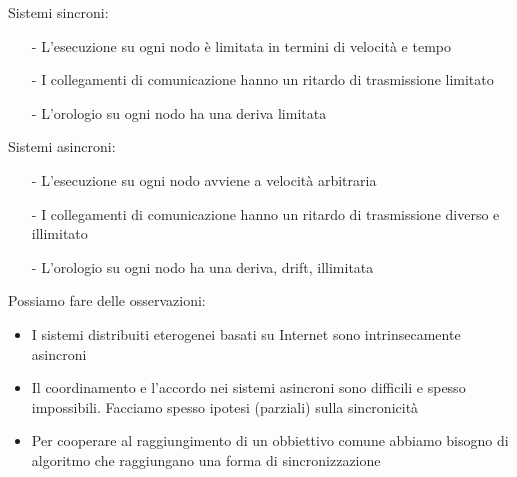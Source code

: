 \documentclass[12pt,italian]{report}
\begin{document}
Sistemi sincroni:
\begin{itemize}
    \item[-] L'esecuzione su ogni nodo è limitata in termini di velocità e tempo
    \item[-] I collegamenti di comunicazione hanno un ritardo di trasmissione limitato
    \item[-] L'orologio su ogni nodo ha una deriva limitata
\end{itemize}
\noindent Sistemi asincroni:
\begin{itemize}
    \item[-] L'esecuzione su ogni nodo avviene a velocità arbitraria
    \item[-] I collegamenti di comunicazione hanno un ritardo di trasmissione diverso e illimitato
    \item[-] L'orologio su ogni nodo ha una deriva, drift, illimitata
\end{itemize}
\newpage
\noindent Possiamo fare delle osservazioni:
\begin{itemize}
    \item I sistemi distribuiti eterogenei basati su Internet sono intrinsecamente asincroni
    \item Il coordinamento e l'accordo nei sistemi asincroni sono difficili e spesso impossibili. Facciamo spesso ipotesi (parziali) sulla sincronicità
    \item Per cooperare al raggiungimento di un obbiettivo comune abbiamo bisogno di algoritmo che raggiungano una forma di sincronizzazione
\end{itemize}
\end{document}

